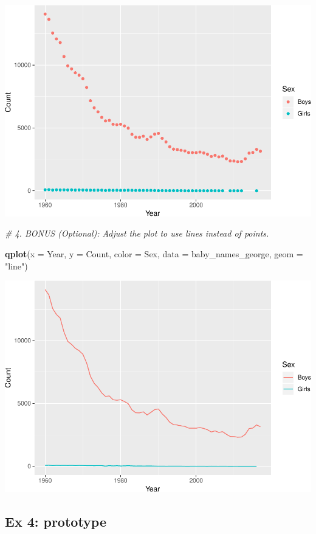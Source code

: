 \documentclass[]{book}
\newenvironment{Shaded}{\begin{snugshade}}{\end{snugshade}}
\newcommand{\CommentTok}[1]{\textcolor[rgb]{0.56,0.35,0.01}{\textit{#1}}}
\newcommand{\DataTypeTok}[1]{\textcolor[rgb]{0.13,0.29,0.53}{#1}}
\newcommand{\KeywordTok}[1]{\textcolor[rgb]{0.13,0.29,0.53}{\textbf{#1}}}
\newcommand{\NormalTok}[1]{#1}
\newcommand{\StringTok}[1]{\textcolor[rgb]{0.31,0.60,0.02}{#1}}
\begin{document}
\includegraphics{R/Rintro/figures/unnamed-chunk-68-1.pdf}

\begin{Shaded}
\begin{Highlighting}[]
\CommentTok{# 4.  BONUS (Optional): Adjust the plot to use lines instead of points.}

\KeywordTok{qplot}\NormalTok{(}\DataTypeTok{x =}\NormalTok{ Year, }\DataTypeTok{y =}\NormalTok{ Count, }\DataTypeTok{color =}\NormalTok{ Sex, }\DataTypeTok{data =}\NormalTok{ baby_names_george, }\DataTypeTok{geom =} \StringTok{"line"}\NormalTok{)}
\end{Highlighting}
\end{Shaded}

\includegraphics{R/Rintro/figures/unnamed-chunk-69-1.pdf}

\hypertarget{ex-4-prototype}{%
\subsection{Ex 4: prototype}\label{ex-4-prototype}}
\end{document}
